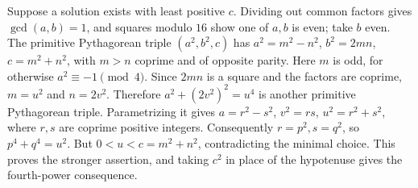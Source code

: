 Suppose a solution exists with least positive $ c $. Dividing out common factors gives $\gcd(a,b)=1 $, and squares modulo $ 16 $ show one of $ a,b $ is even; take $ b $ even. The primitive Pythagorean triple $(a^2,b^2,c)$ has $ a^2=m^2-n^2 $, $ b^2=2mn $, $ c=m^2+n^2 $, with $ m>n $ coprime and of opposite parity. Here $ m $ is odd, for otherwise $ a^2\equiv-1\pmod4 $. Since $ 2mn $ is a square and the factors are coprime, $ m=u^2 $ and $ n=2v^2 $. Therefore $ a^2+(2v^2)^2=u^4 $ is another primitive Pythagorean triple. Parametrizing it gives $ a=r^2-s^2 $, $ v^2=rs $, $ u^2=r^2+s^2 $, where $ r,s $ are coprime positive integers. Consequently $ r=p^2,s=q^2 $, so $ p^4+q^4=u^2 $. But $ 0<u<c=m^2+n^2 $, contradicting the minimal choice. This proves the stronger assertion, and taking $ c^2 $ in place of the hypotenuse gives the fourth-power consequence.
